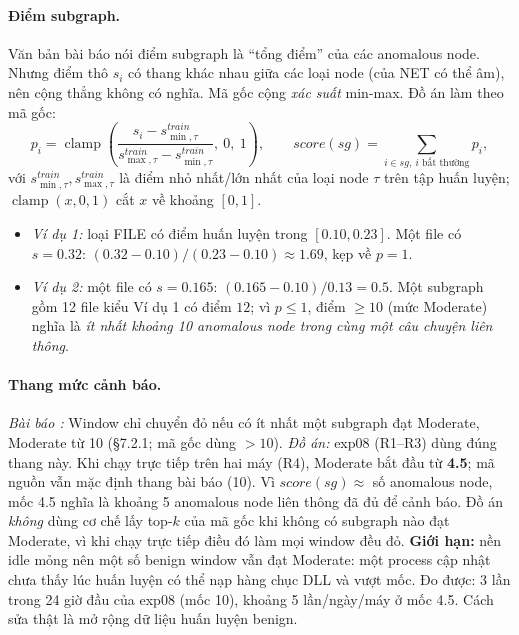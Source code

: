 \paragraph{Điểm subgraph.}
Văn bản bài báo \cite{aly2025ocrapt} nói điểm subgraph là ``tổng điểm'' của các anomalous node. Nhưng điểm thô $s_i$ có thang khác nhau giữa các loại node (của NET có thể âm), nên cộng thẳng không có nghĩa. Mã gốc \cite{ocrapt_repo} cộng \emph{xác suất} min-max. Đồ án làm theo mã gốc:
\[
p_i = \operatorname{clamp}\!\left(\frac{s_i - s^{train}_{\min,\tau}}{s^{train}_{\max,\tau} - s^{train}_{\min,\tau}},\ 0,\ 1\right), \qquad score(sg) = \sum_{i \in sg,\ i \text{ bất thường}} p_i ,
\]
với $s^{train}_{\min,\tau}, s^{train}_{\max,\tau}$ là điểm nhỏ nhất/lớn nhất của loại node $\tau$ trên tập huấn luyện; $\operatorname{clamp}(x, 0, 1)$ cắt $x$ về khoảng $[0, 1]$.
\begin{itemize}
    \item \emph{Ví dụ 1:} loại FILE có điểm huấn luyện trong $[0.10, 0.23]$. Một file có $s = 0.32$: $(0.32 - 0.10)/(0.23 - 0.10) \approx 1.69$, kẹp về $p = 1$.
    \item \emph{Ví dụ 2:} một file có $s = 0.165$: $(0.165 - 0.10)/0.13 = 0.5$. Một subgraph gồm 12 file kiểu Ví dụ 1 có điểm $12$; vì $p \le 1$, điểm $\ge 10$ (mức Moderate) nghĩa là \emph{ít nhất khoảng 10 anomalous node trong cùng một câu chuyện liên thông}.
\end{itemize}

\paragraph{Thang mức cảnh báo.}
\textit{Bài báo \cite{aly2025ocrapt}:} Window chỉ chuyển đỏ nếu có ít nhất một subgraph đạt Moderate, Moderate từ 10 (§7.2.1; mã gốc dùng $> 10$). \textit{Đồ án:} exp08 (R1--R3) dùng đúng thang này. Khi chạy trực tiếp trên hai máy (R4), Moderate bắt đầu từ \textbf{4.5}; mã nguồn vẫn mặc định thang bài báo (10). Vì $score(sg) \approx$ số anomalous node, mốc 4.5 nghĩa là khoảng 5 anomalous node liên thông đã đủ để cảnh báo. Đồ án \emph{không} dùng cơ chế lấy top-$k$ của mã gốc khi không có subgraph nào đạt Moderate, vì khi chạy trực tiếp điều đó làm mọi window đều đỏ. \textbf{Giới hạn:} nền idle mỏng nên một số benign window vẫn đạt Moderate: một process cập nhật chưa thấy lúc huấn luyện có thể nạp hàng chục DLL và vượt mốc. Đo được: 3 lần trong 24 giờ đầu của exp08 (mốc 10), khoảng 5 lần/ngày/máy ở mốc 4.5. Cách sửa thật là mở rộng dữ liệu huấn luyện benign.

